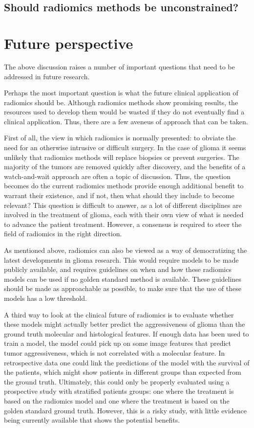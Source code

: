\subsection{Should radiomics methods be unconstrained?}

\section{Future perspective}

The above discussion raises a number of important questions that need to be addressed in future research.

Perhaps the most important question is what the future clinical application of radiomics should be.
Although radiomics methods show promising results, the resources used to develop them would be wasted if they do not eventually find a clinical application.
Thus, there are a few aveneus of approach that can be taken.

First of all, the view in which radiomics is normally presented: to obviate the need for an otherwise intrusive or difficult surgery.
In the case of glioma it seems unlikely that radiomics methods will replace biopsies or prevent surgeries.
The majority of the \glspl{tumor} are removed quickly after discovery, and the benefits of a watch-and-wait approach are often a topic of discussion.
Thus, the question becomes do the current radiomics methods provide enough additional benefit to warrant their existence, and if not, then what should they include to become relevant?
This question is difficult to answer, as a lot of different disciplines are involved in the treatment of glioma, each with their own view of what is needed to advance the patient treatment.
However, a consensus is required to steer the field of radiomics in the right direction.

As mentioned above, radiomics can also be viewed as a way of democratizing the latest  developments in glioma research.
This would require models to be made publicly available, and requires guidelines on when and how these radiomics models can be used if no golden standard method is available.
These guidelines should be made as approachable as possible, to make sure that the use of these models has a low threshold.

A third way to look at the clinical future of radiomics is to evaluate whether these models might actually better predict the aggressiveness of \gls{glioma} than the ground truth molecular and histological features.
If enough data has been used to train a model, the model could pick up on some image features that predict \gls{tumor} aggressiveness, which is not correlated with a molecular feature.
In retrospective data one could link the predictions of the model with the survival of the patients, which might show patients in different groups than expected from the ground truth.
Ultimately, this could only be properly evaluated using a prospective study with stratified patients groups: one where the treatment is based on the radiomics model and one where the treatment is based on the golden standard ground truth.
However, this is a risky study, with little evidence being currently available that shows the potential benefits.

